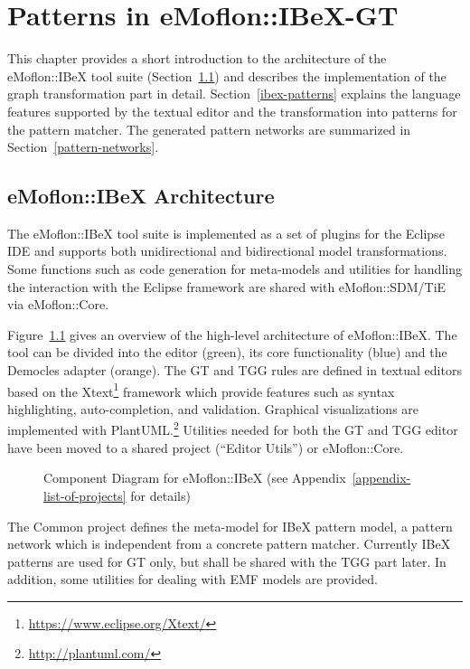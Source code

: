 
\chapter{Patterns in eMoflon::IBeX-GT}
\label{concept-and-implementation}
This chapter provides a short introduction to the architecture of the eMoflon::IBeX tool suite (Section~\ref{emoflon-ibex-architecture}) and describes the implementation of the graph transformation part in detail.
Section~\ref{ibex-patterns} explains the language features supported by the textual editor and the transformation into patterns for the pattern matcher.
The generated pattern networks are summarized in Section~\ref{pattern-networks}.

\section{eMoflon::IBeX Architecture}
\label{emoflon-ibex-architecture}
The eMoflon::IBeX tool suite is implemented as a set of plugins for the Eclipse IDE and supports both unidirectional and bidirectional model transformations.
Some functions such as code generation for meta-models and utilities for handling the interaction with the Eclipse framework are shared with eMoflon::SDM/TiE via eMoflon::Core.

Figure~\ref{fig:emoflon-ibex-components} gives an overview of the high-level architecture of eMoflon::IBeX.
The tool can be divided into the editor (green), its core functionality (blue) and the Democles adapter (orange). 
The GT and TGG rules are defined in textual editors based on the Xtext\footnote{\url{https://www.eclipse.org/Xtext/}} framework which provide features such as syntax highlighting, auto-completion, and validation.
Graphical visualizations are implemented with PlantUML.\footnote{\url{http://plantuml.com/}}
Utilities needed for both the GT and TGG editor have been moved to a shared project (``Editor Utils'') or eMoflon::Core.

\begin{figure}[h!]
	\centering
	
	\caption[Component Diagram for eMoflon::IBeX]{Component Diagram for eMoflon::IBeX (see Appendix~\ref{appendix-list-of-projects} for details)}
	\label{fig:emoflon-ibex-components}
\end{figure}

\noindent
The Common project defines the meta-model for IBeX pattern model, a pattern network which is independent from a concrete pattern matcher.
Currently IBeX patterns are used for GT only, but shall be shared with the TGG part later.
In addition, some utilities for dealing with EMF models are provided.

